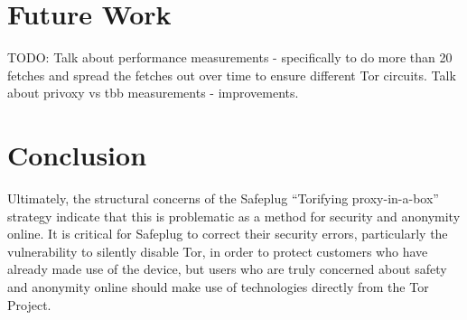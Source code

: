 \documentclass[letterpaper,twocolumn,10pt]{article}
\begin{document}
\section{Future Work}
TODO: Talk about performance measurements - specifically to do more than 20 fetches and spread the fetches out over time to ensure different Tor circuits.  Talk about privoxy vs tbb measurements - improvements.

\section{Conclusion}
Ultimately, the structural concerns of the Safeplug ``Torifying proxy-in-a-box'' strategy indicate that this is problematic as a method for security and anonymity online.  It is critical for Safeplug to correct their security errors, particularly the vulnerability to silently disable Tor, in order to protect customers who have already made use of the device, but users who are truly concerned about safety and anonymity online should make use of technologies directly from the Tor Project.

{\footnotesize 
}

\end{document}
